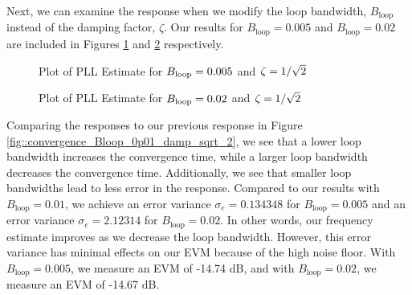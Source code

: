 \documentclass{article}
\begin{document}
Next, we can examine the response when we modify the loop bandwidth, $B_\text{loop}$ instead of the damping factor, $\zeta$. Our results for $B_\text{loop} = 0.005$ and $B_\text{loop} = 0.02$ are included in Figures \ref{fig::convergence_Bloop_0p005_damp_sqrt_2} and \ref{fig::convergence_Bloop_0p02_damp_sqrt_2} respectively.

\begin{figure}[H]
	\centerline{}
	\caption{Plot of PLL Estimate for $\protect{B_\text{loop}} = 0.005$ and $\protect{\zeta = 1/\sqrt{2}}$}
	\label{fig::convergence_Bloop_0p005_damp_sqrt_2}
\end{figure}

\begin{figure}[H]
	\centerline{}
	\caption{Plot of PLL Estimate for $\protect{B_\text{loop}} = 0.02$ and $\protect{\zeta = 1/\sqrt{2}}$}
	\label{fig::convergence_Bloop_0p02_damp_sqrt_2}
\end{figure}

\noindent Comparing the responses to our previous response in Figure \ref{fig::convergence_Bloop_0p01_damp_sqrt_2}, we see that a lower loop bandwidth increases the convergence time, while a larger loop bandwidth decreases the convergence time. Additionally, we see that smaller loop bandwidths lead to less error in the response. Compared to our results with $B_{\text{loop}} = 0.01$, we achieve an error variance $\sigma_e=0.134348$ for $B_{\text{loop}} = 0.005$ and an error variance $\sigma_e=2.12314$ for $B_{\text{loop}} = 0.02$. In other words, our frequency estimate improves as we decrease the loop bandwidth. However, this error variance has minimal effects on our EVM because of the high noise floor. With $B_{\text{loop}} = 0.005$, we measure an EVM of -14.74 dB, and with $B_{\text{loop}} = 0.02$, we measure an EVM of -14.67 dB. 
\end{document}
